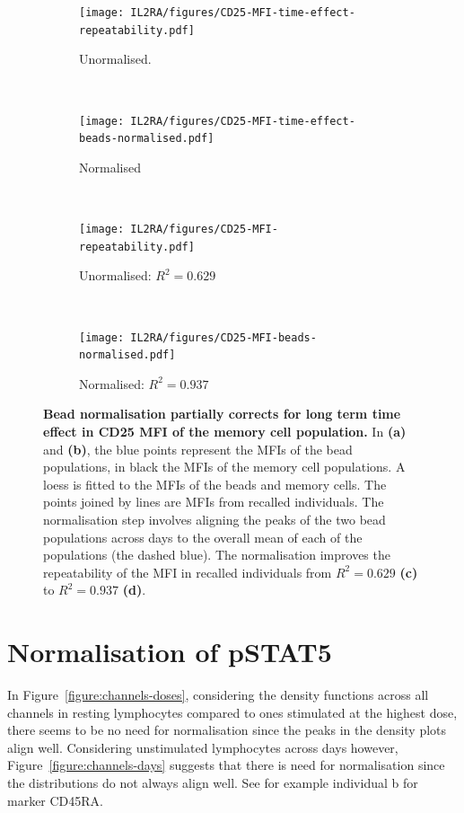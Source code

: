 \begin{figure}[ht]
    \begin{subfigure}[b]{.5\textwidth}
        \centering
        \texttt{[image: IL2RA/figures/CD25-MFI-time-effect-repeatability.pdf]}
        \caption{Unormalised.}
    \end{subfigure}
    ~
    \begin{subfigure}[b]{.5\textwidth}
        \centering
        \texttt{[image: IL2RA/figures/CD25-MFI-time-effect-beads-normalised.pdf]}
        \caption{Normalised}
    \end{subfigure}
    ~
    \begin{subfigure}[b]{.5\textwidth}
        \centering
        \texttt{[image: IL2RA/figures/CD25-MFI-repeatability.pdf]}
        \caption{Unormalised: $R^2=0.629$}
    \end{subfigure}
    ~
    \begin{subfigure}[b]{.5\textwidth}
        \centering
        \texttt{[image: IL2RA/figures/CD25-MFI-beads-normalised.pdf]}
        \caption{Normalised: $R^2=0.937$}
    \end{subfigure}
    \caption{ \label{figure:CD25-MFI-beads-normalised.pdf}
\textbf{Bead normalisation partially corrects for long term time effect in CD25 MFI of the memory cell population.}
In \textbf{(a)} and \textbf{(b)}, the blue points represent the MFIs of the bead populations, in black the MFIs of the memory cell populations.
A loess is fitted to the MFIs of the beads and memory cells.
The points joined by lines are MFIs from recalled individuals.
The normalisation step involves aligning the peaks of the two bead populations across days to the overall mean of each of the populations (the dashed blue).
The normalisation improves the repeatability of the MFI in recalled individuals from $R^2=0.629$ \textbf{(c)} to $R^2=0.937$ \textbf{(d)}.
}
\end{figure}


\section{Normalisation of pSTAT5}

In Figure~\ref{figure:channels-doses}, considering the density functions across all channels in resting lymphocytes compared to ones stimulated at the highest dose,
there seems to be no need for normalisation since the peaks in the density plots align well.
Considering unstimulated lymphocytes across days however, Figure~\ref{figure:channels-days} suggests that there is need for normalisation since the distributions do not always align well.
See for example individual b for marker CD45RA.


